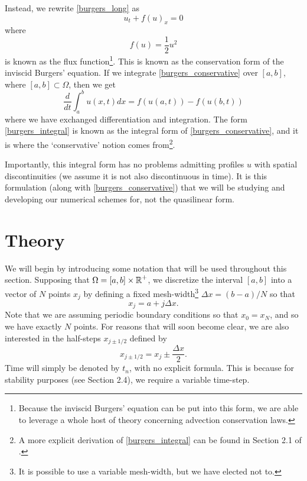 \documentclass{myproject}
\begin{document}
Instead, we rewrite \eqref{burgers_long} as
\begin{equation}\label{burgers_conservative}
    u_t + f(u)_x = 0
\end{equation}
where
\begin{equation}
    f(u) = \frac{1}{2}u^2
\end{equation}
is known as the flux function\footnote{Because the inviscid Burgers' equation can be put into this form, we are able to leverage a whole host of theory concerning advection conservation laws.}. This is known as the conservation form of the inviscid Burgers' equation. If we integrate \eqref{burgers_conservative} over $[a,b]$, where $[a,b] \subset \Omega$, then we get
\begin{equation}\label{burgers_integral}
    \frac{d}{dt}\int_{a}^{b} u(x,t) dx = f(u(a,t)) - f(u(b,t))
\end{equation}
where we have exchanged differentiation and integration. The form \eqref{burgers_integral} is known as the integral form of \eqref{burgers_conservative}, and it is where the `conservative' notion comes from\footnote{A more explicit derivation of \eqref{burgers_integral} can be found in Section 2.1 of \cite{leveque2002}.}.

Importantly, this integral form has no problems admitting profiles $u$ with spatial discontinuities (we assume it is not also discontinuous in time). It is this formulation (along with \eqref{burgers_conservative}) that we will be studying and developing our numerical schemes for, not the quasilinear form. 

\section{Theory}

We will begin by introducing some notation that will be used throughout this section. Supposing that $\Omega = [a,b]\times\operatorname{\mathbb{R}}^+$, we discretize the interval $[a,b]$ into a vector of $N$ points $x_j$ by defining a fixed mesh-width\footnote{It is possible to use a variable mesh-width, but we have elected not to.} $\Delta x = (b-a)/N$ so that
\begin{equation}
    x_j = a + j\Delta x.
\end{equation}
Note that we are assuming periodic boundary conditions so that $x_0 = x_{N}$, and so we have exactly $N$ points. For reasons that will soon become clear, we are also interested in the half-steps $x_{j\pm1/2}$ defined by
\[
    x_{j\pm1/2} = x_j \pm \frac{\Delta x}{2}.
\]
Time will simply be denoted by $t_n$, with no explicit formula. This is because for stability purposes (see Section 2.4), we require a variable time-step.
\end{document}
